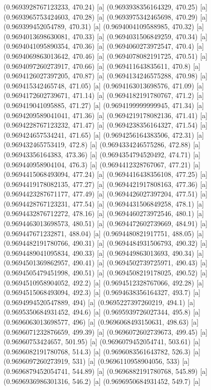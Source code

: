 {{{(0.9693928767123233, 470.24) [a] 
(0.9693938356164329, 470.25) [a] 
(0.9693965753424603, 470.28) [a] 
(0.9693975342465698, 470.29) [a] 
(0.969399452054789, 470.31) [a] 
(0.9694004109588985, 470.32) [a] 
(0.9694013698630081, 470.33) [a] 
(0.9694031506849259, 470.34) [a] 
(0.9694041095890354, 470.36) [a] 
(0.9694060273972547, 470.4) [a] 
(0.9694069863013642, 470.46) [a] 
(0.9694078082191725, 470.51) [a] 
(0.9694097260273917, 470.66) [a] 
(0.969411643835611, 470.8) [a] 
(0.9694126027397205, 470.87) [a] 
(0.9694134246575288, 470.98) [a] 
(0.969415342465748, 471.05) [a] 
(0.9694163013698576, 471.09) [a] 
(0.9694172602739671, 471.14) [a] 
(0.9694182191780767, 471.2) [a] 
(0.969419041095885, 471.27) [a] 
(0.9694199999999945, 471.34) [a] 
(0.9694209589041041, 471.36) [a] 
(0.9694219178082136, 471.41) [a] 
(0.9694228767123232, 471.47) [a] 
(0.9694238356164327, 471.54) [a] 
(0.969424657534241, 471.65) [a] 
(0.9694256164383506, 472.31) [a] 
(0.969432465753419, 472.8) [a] 
(0.9694334246575286, 472.88) [a] 
(0.96943356164383, 473.36) [a] 
(0.9694354794520492, 474.71) [a] 
(0.969440958904104, 476.3) [a] 
(0.9694412328767067, 477.21) [a] 
(0.9694415068493094, 477.24) [a] 
(0.9694416438356108, 477.25) [a] 
(0.9694419178082135, 477.27) [a] 
(0.9694421917808163, 477.36) [a] 
(0.9694423287671177, 477.49) [a] 
(0.9694426027397204, 477.51) [a] 
(0.9694428767123231, 477.54) [a] 
(0.9694431506849258, 478.1) [a] 
(0.9694432876712272, 478.16) [a] 
(0.9694460273972546, 480.1) [a] 
(0.9694463013698573, 480.51) [a] 
(0.9694472602739669, 484.91) [a] 
(0.969447671232871, 488.04) [a] 
(0.9694480821917751, 488.05) [a] 
(0.9694482191780766, 490.31) [a] 
(0.9694484931506793, 490.32) [a] 
(0.9694489041095834, 490.33) [a] 
(0.969449863013693, 490.34) [a] 
(0.9694501369862957, 490.41) [a] 
(0.9694502739725971, 490.43) [a] 
(0.9694505479451998, 490.51) [a] 
(0.9694508219178025, 490.52) [a] 
(0.9694510958904052, 492.2) [a] 
(0.9694512328767066, 492.28) [a] 
(0.9694515068493094, 492.3) [a] 
(0.9694638356164327, 493.7) [a] 
(0.9694994520547889, 494) [a] 
(0.9695227397260219, 494.1) [a] 
(0.9695350684931452, 494.6) [a] 
(0.9695939726027344, 495.8) [a] 
(0.9696063013698577, 496) [a] 
(0.9696068493150631, 498.63) [a] 
(0.9696071232876659, 499.39) [a] 
(0.9696072602739673, 499.45) [a] 
(0.96960753424657, 501.95) [a] 
(0.9696079452054741, 503.61) [a] 
(0.9696082191780768, 514.3) [a] 
(0.9696083561643782, 526.3) [a] 
(0.9696097260273919, 531) [a] 
(0.9696110958904056, 533) [a] 
(0.9696879452054741, 544.89) [a] 
(0.9696882191780768, 545.89) [a] 
(0.9696936986301316, 546.2) [a] 
(0.9696950684931452, 549.7) [a] 
}}}
